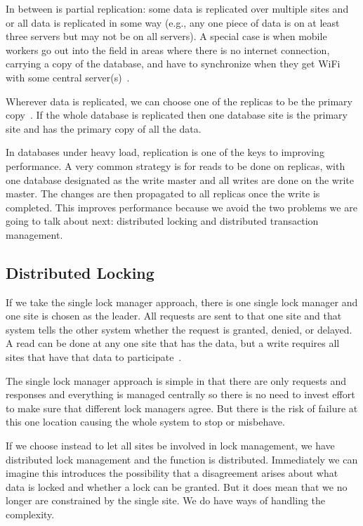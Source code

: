In between is partial replication: some data is replicated over multiple sites and or all data is replicated in some way (e.g., any one piece of data is on at least three servers but may not be on all servers). A special case is when mobile workers go out into the field in areas where there is no internet connection, carrying a copy of the database, and have to synchronize when they get WiFi with some central server(s)~\cite{fds}.

Wherever data is replicated, we can choose one of the replicas to be the primary copy~\cite{dsc}. If the whole database is replicated then one database site is the primary site and has the primary copy of all the data. 

In databases under heavy load, replication is one of the keys to improving performance. A very common strategy is for reads to be done on replicas, with one database designated as the write master and all writes are done on the write master. The changes are then propagated to all replicas once the write is completed. This improves performance because we avoid the two problems we are going to talk about next: distributed locking and distributed transaction management.

\subsection*{Distributed Locking}

If we take the single lock manager approach, there is one single lock manager and one site is chosen as the leader. All requests are sent to that one site and that system tells the other system whether the request is granted, denied, or delayed. A read can be done at any one site that has the data, but a write requires all sites that have that data to participate~\cite{dsc}.

The single lock manager approach is simple in that there are only requests and responses and everything is managed centrally so there is no need to invest effort to make sure that different lock managers agree. But there is the risk of failure at this one location causing the whole system to stop or misbehave.

If we choose instead to let all sites be involved in lock management, we have distributed lock management and the function is distributed. Immediately we can imagine this introduces the possibility that a disagreement arises about what data is locked and whether a lock can be granted. But it does mean that we no longer are constrained by the single site. We do have ways of handling the complexity.

